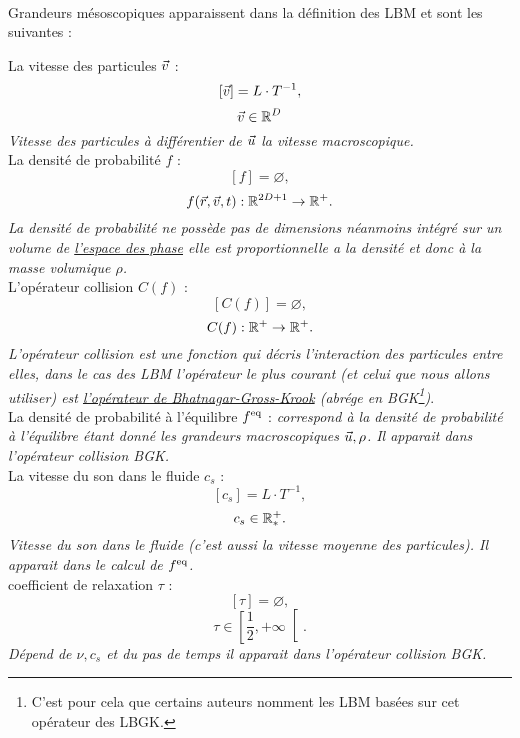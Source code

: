 \paragraph*{}
  Grandeurs mésoscopiques apparaissent dans la définition des LBM et sont les suivantes :
  \begin{itemize} \label{eq:defmeso}
    \itemb La vitesse des particules $\vec{v}$ :
    $$[\vec{v}] =  L \cdot T^{-1},$$
    $$\vec{v} \in \mathbb{R}^D$$
    \emph{Vitesse des particules à différentier de $\vec{u}$ la vitesse macroscopique.}\\
    \itemb La densité de probabilité $f$ :
    $$[f] =  \varnothing,$$
    $$f(\vec{r},\vec{v},t) : \mathbb{R}^{2D+1} \to \mathbb{R}^+.$$
    \emph{La densité de probabilité ne possède pas de dimensions néanmoins intégré sur un volume de 
    \href{https://fr.wikipedia.org/wiki/Espace_des_phases}{l'espace des phase} elle est proportionnelle a la densité et
    donc à la masse volumique $\rho$.}\\
    \itemb L'opérateur collision $C(f)$ :
    $$[C(f)] = \varnothing,$$
    $$C(f) : \mathbb{R}^+ \to \mathbb{R}^+.$$
    \emph{L'opérateur collision est une fonction qui décris l'interaction des particules entre elles, dans le cas des  
    LBM l'opérateur le plus courant (et celui que nous allons utiliser) est 
    \href{https://fr.wikipedia.org/wiki/M\%C3\%A9thode_de_Bhatnagar-Gross-Krook}{l'opérateur de Bhatnagar-Gross-Krook}
    (abrége en BGK\footnote{C'est pour cela que certains auteurs nomment les LBM basées sur cet opérateur des LBGK.})}.
    \\
    \itemb La densité de probabilité à l'équilibre $f^{\text{eq}}$ :
    \emph{correspond à la densité de probabilité à l'équilibre étant donné les grandeurs macroscopiques $\vec{u}, \rho$. 
    Il apparait dans l'opérateur collision BGK.}\\
    \itemb La vitesse du son dans le fluide $c_s$ :
    $$[c_s] = L\cdot T^{-1},$$
    $$c_s \in \mathbb{R}^+_*.$$
    \emph{Vitesse du son dans le fluide (c'est aussi la vitesse moyenne des particules). Il apparait dans le calcul de 
    $f^{\text{eq}}$.}\\
    \itemb coefficient de relaxation $\tau$ :
    $$[\tau] = \varnothing,$$
    $$\tau \in \left[\frac{1}{2},+ \infty \right[.$$
    \emph{Dépend de $\nu, c_s$ et du pas de temps il apparait dans l'opérateur collision BGK.}\\
  \end{itemize}
 
